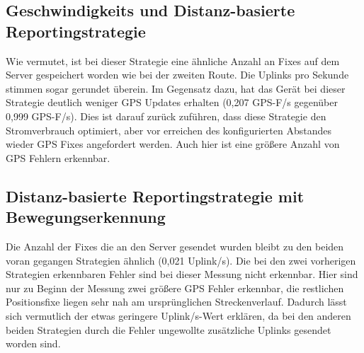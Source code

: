 \subsection{Geschwindigkeits und Distanz-basierte Reportingstrategie}
Wie vermutet, ist bei dieser Strategie eine ähnliche Anzahl an Fixes auf dem Server gespeichert worden wie bei der zweiten Route. Die Uplinks pro Sekunde stimmen sogar gerundet überein. Im Gegensatz dazu, hat das Gerät bei dieser Strategie deutlich weniger GPS Updates erhalten (0,207 GPS-F/s gegenüber 0,999 GPS-F/s). Dies ist darauf zurück zuführen, dass diese Strategie den Stromverbrauch optimiert, aber vor erreichen des konfigurierten Abstandes wieder GPS Fixes angefordert werden. Auch hier ist eine größere Anzahl von GPS Fehlern erkennbar. 

\subsection{Distanz-basierte Reportingstrategie mit Bewegungserkennung}
Die Anzahl der Fixes die an den Server gesendet wurden bleibt zu den beiden voran gegangen Strategien ähnlich (0,021 Uplink/s). Die bei den zwei vorherigen Strategien erkennbaren Fehler sind bei dieser Messung nicht erkennbar. Hier sind nur zu Beginn der Messung zwei größere GPS Fehler erkennbar, die restlichen Positionsfixe liegen sehr nah am ursprünglichen Streckenverlauf. Dadurch lässt sich vermutlich der etwas geringere Uplink/s-Wert erklären, da bei den anderen beiden Strategien durch die Fehler ungewollte zusätzliche Uplinks gesendet worden sind.

